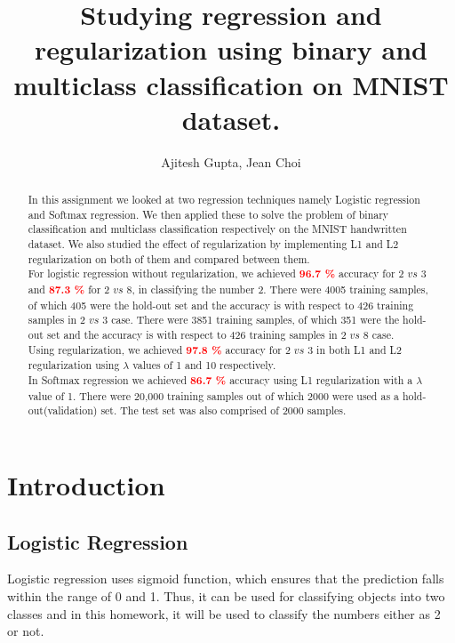 \documentclass[11pt,twoside]{article}
\author{Ajitesh Gupta, Jean Choi} %
\title{Studying regression and regularization using binary and multiclass classification on MNIST dataset.} %
\begin{document}
\maketitle

\begin{abstract}
In this assignment we looked at two regression techniques namely Logistic regression and Softmax regression. We then applied these to solve the problem of binary classification and multiclass classification respectively on the MNIST handwritten dataset. We also studied the effect of regularization by implementing L1 and L2 regularization on both of them and compared between them.\\

For logistic regression without regularization, we achieved \textcolor{red}{\textbf{96.7 \%}} accuracy for 2 $vs$ 3 and \textcolor{red}{\textbf{87.3 \%}} for 2 $vs$ 8, in classifying the number 2. There were 4005 training samples, of which 405 were the hold-out set and the accuracy is with respect to 426 training samples in 2 $vs$ 3 case. There were 3851 training samples, of which 351 were the hold-out set and the accuracy is with respect to 426 training samples in 2 $vs$ 8 case.\\

Using regularization, we achieved \textcolor{red}{\textbf{97.8 \%}} accuracy for 2 $vs$ 3 in both L1 and L2 regularization using $\lambda$ values of 1 and 10 respectively.\\

In Softmax regression we achieved \textcolor{red}{\textbf{86.7 \%}} accuracy using L1 regularization with a $\lambda$ value of 1. There were 20,000 training samples out of which 2000 were used as a hold-out(validation) set. The test set was also comprised of 2000 samples.

\end{abstract}

\section{Introduction}


\subsection{Logistic Regression}

Logistic regression uses sigmoid function, which ensures that the prediction falls within the range of 0 and 1. Thus, it can be used for classifying objects into two classes and in this homework, it will be used to classify the numbers either as 2 or not.\\
\end{document}
